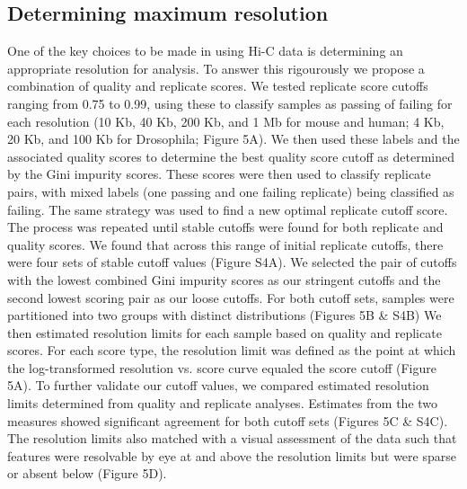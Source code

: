 
\subsection{Determining maximum resolution}

One of the key choices to be made in using Hi-C data is determining an appropriate resolution for analysis. To answer this rigourously we propose a combination of quality and replicate scores. We tested replicate score cutoffs ranging from 0.75 to 0.99, using these to classify samples as passing of failing for each resolution (10 Kb, 40 Kb, 200 Kb, and 1 Mb for mouse and human; 4 Kb, 20 Kb, and 100 Kb for Drosophila; Figure 5A). We then used these labels and the associated quality scores to determine the best quality score cutoff as determined by the Gini impurity scores. These scores were then used to classify replicate pairs, with mixed labels (one passing and one failing replicate) being classified as failing. The same strategy was used to find a new optimal replicate cutoff score. The process was repeated until stable cutoffs were found for both replicate and quality scores. We found that across this range of initial replicate cutoffs, there were four sets of stable cutoff values (Figure S4A). We selected the pair of cutoffs with the lowest combined Gini impurity scores as our stringent cutoffs and the second lowest scoring pair as our loose cutoffs. For both cutoff sets, samples were partitioned into two groups with distinct distributions (Figures 5B \& S4B) We then estimated resolution limits for each sample based on quality and replicate scores. For each score type, the resolution limit was defined as the point at which the log-transformed resolution vs. score curve equaled the score cutoff (Figure 5A). To further validate our cutoff values, we compared estimated resolution limits determined from quality and replicate analyses. Estimates from the two measures showed significant agreement for both cutoff sets (Figures 5C \& S4C). The resolution limits also matched with a visual assessment of the data such that features were resolvable by eye at and above the resolution limits but were sparse or absent below (Figure 5D).

